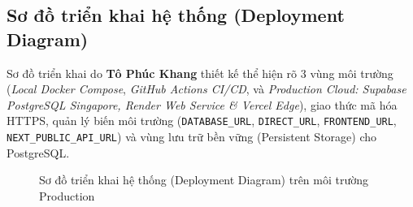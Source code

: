 \subsection{Sơ đồ triển khai hệ thống (Deployment Diagram)}
Sơ đồ triển khai do \textbf{Tô Phúc Khang} thiết kế thể hiện rõ 3 vùng môi trường (\textit{Local Docker Compose}, \textit{GitHub Actions CI/CD}, và \textit{Production Cloud: Supabase PostgreSQL Singapore, Render Web Service \& Vercel Edge}), giao thức mã hóa HTTPS, quản lý biến môi trường (\texttt{DATABASE\_URL}, \texttt{DIRECT\_URL}, \texttt{FRONTEND\_URL}, \texttt{NEXT\_PUBLIC\_API\_URL}) và vùng lưu trữ bền vững (Persistent Storage) cho PostgreSQL.

\begin{figure}[H]
\centering
{}
\caption{Sơ đồ triển khai hệ thống (Deployment Diagram) trên môi trường Production}
\end{figure}